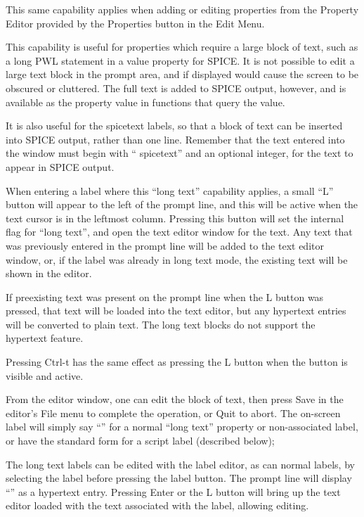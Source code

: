 This same capability applies when adding or editing properties from
the {\cb Property Editor} provided by the {\cb Properties} button in
the {\cb Edit Menu}.

This capability is useful for properties which require a large block
of text, such as a long PWL statement in a {\et value} property for
SPICE.  It is not possible to edit a large text block in the prompt
area, and if displayed would cause the screen to be obscured or
cluttered.  The full text is added to SPICE output, however, and is
available as the property value in functions that query the value.

It is also useful for the {\vt spicetext} labels, so that a block of
text can be inserted into SPICE output, rather than one line. 
Remember that the text entered into the window must begin with ``{\vt
spicetext}'' and an optional integer, for the text to appear in SPICE
output.

When entering a label where this ``long text'' capability applies, a
small ``{\cb L}'' button will appear to the left of the prompt line,
and this will be active when the text cursor is in the leftmost
column.  Pressing this button will set the internal flag for ``long
text'', and open the text editor window for the text.  Any text that
was previously entered in the prompt line will be added to the text
editor window, or, if the label was already in long text mode, the
existing text will be shown in the editor.

If preexisting text was present on the prompt line when the {\cb L}
button was pressed, that text will be loaded into the text editor, but
any hypertext entries will be converted to plain text.  The long text
blocks do not support the hypertext feature.

Pressing {\kb Ctrl-t} has the same effect as pressing the {\cb L}
button when the button is visible and active.

From the editor window, one can edit the block of text, then press
{\cb Save} in the editor's {\cb File} menu to complete the operation,
or {\cb Quit} to abort.  The on-screen label will simply say ``{\vt
[text]}'' for a normal ``long text'' property or non-associated label,
or have the standard form for a script label (described below);

The long text labels can be edited with the label editor, as can
normal labels, by selecting the label before pressing the {\cb label}
button.  The prompt line will display ``{\vt [text]}'' as a hypertext
entry.  Pressing {\kb Enter} or the {\cb L} button will bring up the
text editor loaded with the text associated with the label, allowing
editing.

